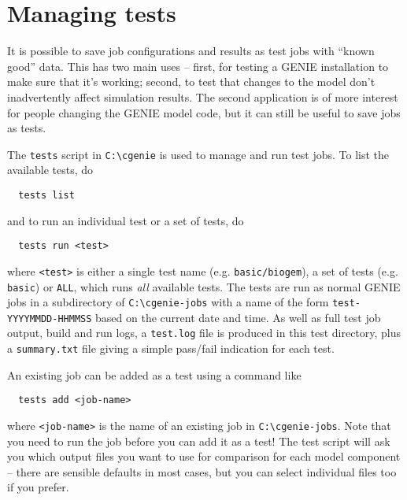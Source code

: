\documentclass[a4paper,10pt,article]{memoir}
\begin{document}
\section{Managing tests}

It is possible to save job configurations and results as test jobs
with ``known good'' data.  This has two main uses -- first, for
testing a GENIE installation to make sure that it's working; second,
to test that changes to the model don't inadvertently affect
simulation results.  The second application is of more interest for
people changing the GENIE model code, but it can still be useful to
save jobs as tests.

The \texttt{tests} script in \texttt{C:\textbackslash{}cgenie} is used
to manage and run test jobs.  To list the available tests, do
\begin{verbatim}
  tests list
\end{verbatim}
and to run an individual test or a set of tests, do
\begin{verbatim}
  tests run <test>
\end{verbatim}
where \texttt{<test>} is either a single test name (e.g.
\texttt{basic/biogem}), a set of tests (e.g. \texttt{basic}) or
\texttt{ALL}, which runs \emph{all} available tests.  The tests are
run as normal GENIE jobs in a subdirectory of
\texttt{C:\textbackslash{}cgenie-jobs} with a name of the form
\texttt{test-YYYYMMDD-HHMMSS} based on the current date and time.  As
well as full test job output, build and run logs, a \texttt{test.log}
file is produced in this test directory, plus a \texttt{summary.txt}
file giving a simple pass/fail indication for each test.

An existing job can be added as a test using a command like
\begin{verbatim}
  tests add <job-name>
\end{verbatim}
where \texttt{<job-name>} is the name of an existing job in
\texttt{C:\textbackslash{}cgenie-jobs}.  Note that you need to run the
job before you can add it as a test!  The test script will ask you
which output files you want to use for comparison for each model
component -- there are sensible defaults in most cases, but you can
select individual files too if you prefer.
\end{document}
